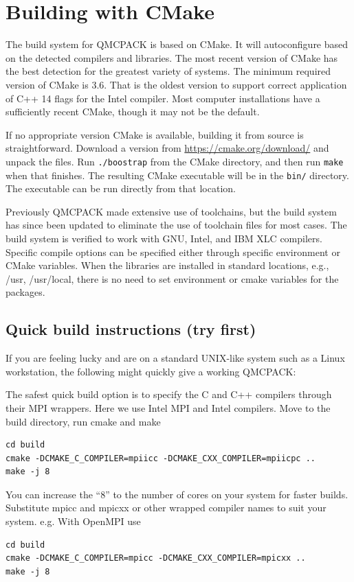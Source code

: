 \section{Building with CMake}
\label{sec:cmake}
The build system for QMCPACK is based on CMake.  It will autoconfigure
based on the detected compilers and libraries. The most recent
version of CMake has the best detection for the greatest variety of
systems.  The minimum required version of CMake is 3.6.  That is the
oldest version to support correct application of C++ 14 flags for the Intel compiler.
Most computer installations have a sufficiently recent CMake, though it may not be
the default.

If no appropriate version CMake is available, building it from source is straightforward.
Download a version from \url{https://cmake.org/download/} and unpack the files.
Run \texttt{./boostrap} from the CMake directory, and then run \texttt{make}
when that finishes.  The resulting CMake executable will be in the \texttt{bin/} directory.
The executable can be run directly from that location.

Previously QMCPACK made extensive use of toolchains, but the build system
has since been updated to eliminate the use of toolchain files for
most cases.  The build system is verified to work with GNU, Intel, and IBM XLC
compilers.  Specific compile options can be specified either through
specific environment or CMake variables.  When the libraries are
installed in standard locations, e.g., /usr, /usr/local, there is no
need to set environment or cmake variables for the packages.

\subsection{Quick build instructions (try first)}
\label{sec:cmakequick}

If you are feeling lucky and are on a standard UNIX-like system such
as a Linux workstation, the following might quickly give a
working QMCPACK:

The safest quick build option is to specify the C and C++ compilers
through their MPI wrappers. Here we use Intel MPI and Intel
compilers. Move to the build directory, run cmake and make
\verbatimfont{\footnotesize}
\begin{verbatim}
cd build
cmake -DCMAKE_C_COMPILER=mpiicc -DCMAKE_CXX_COMPILER=mpiicpc ..
make -j 8
\end{verbatim}
You can increase the ``8'' to the number of cores on your system for
faster builds. Substitute mpicc and mpicxx or other wrapped compiler names to suit
  your system. e.g. With OpenMPI use
\verbatimfont{\footnotesize}
\begin{verbatim}
cd build
cmake -DCMAKE_C_COMPILER=mpicc -DCMAKE_CXX_COMPILER=mpicxx ..
make -j 8
\end{verbatim}

